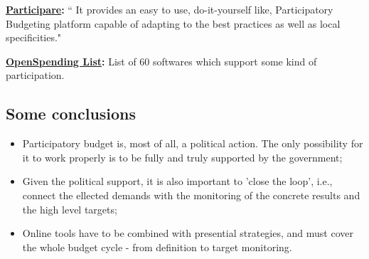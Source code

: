 \noindent\textbf{\href{https://www.participare.io/}{Participare}: } `` It provides an easy to use, do-it-yourself like, Participatory Budgeting platform capable of adapting to the best practices as well as local specificities."

\noindent\textbf{\href{https://docs.google.com/spreadsheets/d/1f1iHQFGIc5MmmzdRVkBk6hXyrrLnoNP4aaOM9w85agw/}{OpenSpending List}: } List of 60 softwares which support some kind of participation.

\subsection{Some conclusions}
\begin{itemize}
\item Participatory budget is, most of all, a political action. The only possibility for it to work properly is to be fully and truly supported by the government;
\item Given the political support, it is also important to 'close the loop', i.e., connect the ellected demands with the monitoring of the concrete results and the high level targets;
\item Online tools have to be combined with presential strategies, and must cover the whole budget cycle - from definition to target monitoring.
\end{itemize}

